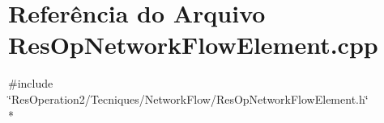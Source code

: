 \section{Referência do Arquivo Res\+Op\+Network\+Flow\+Element.\+cpp}
\label{_res_op_network_flow_element_8cpp}
{\ttfamily \#include \char`\"{}Res\+Operation2/\+Tecniques/\+Network\+Flow/\+Res\+Op\+Network\+Flow\+Element.\+h\char`\"{}}\\*

